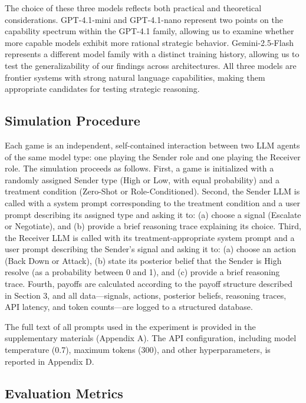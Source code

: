 \documentclass[12pt]{article}
\theoremstyle{plain}
\theoremstyle{definition}
\begin{document}
The choice of these three models reflects both practical and theoretical considerations. GPT-4.1-mini and GPT-4.1-nano represent two points on the capability spectrum within the GPT-4.1 family, allowing us to examine whether more capable models exhibit more rational strategic behavior. Gemini-2.5-Flash represents a different model family with a distinct training history, allowing us to test the generalizability of our findings across architectures. All three models are frontier systems with strong natural language capabilities, making them appropriate candidates for testing strategic reasoning.

\subsection{Simulation Procedure}

Each game is an independent, self-contained interaction between two LLM agents of the same model type: one playing the Sender role and one playing the Receiver role. The simulation proceeds as follows. First, a game is initialized with a randomly assigned Sender type (High or Low, with equal probability) and a treatment condition (Zero-Shot or Role-Conditioned). Second, the Sender LLM is called with a system prompt corresponding to the treatment condition and a user prompt describing its assigned type and asking it to: (a) choose a signal (Escalate or Negotiate), and (b) provide a brief reasoning trace explaining its choice. Third, the Receiver LLM is called with its treatment-appropriate system prompt and a user prompt describing the Sender's signal and asking it to: (a) choose an action (Back Down or Attack), (b) state its posterior belief that the Sender is High resolve (as a probability between 0 and 1), and (c) provide a brief reasoning trace. Fourth, payoffs are calculated according to the payoff structure described in Section 3, and all data---signals, actions, posterior beliefs, reasoning traces, API latency, and token counts---are logged to a structured database.

The full text of all prompts used in the experiment is provided in the supplementary materials (Appendix A). The API configuration, including model temperature (0.7), maximum tokens (300), and other hyperparameters, is reported in Appendix D.

\subsection{Evaluation Metrics}
\end{document}
